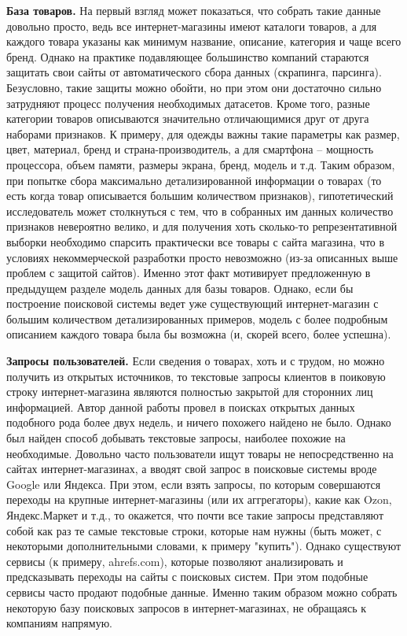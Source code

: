 \documentclass[12pt,a4paper]{article}
\begin{document}
\textbf{База товаров.} На первый взгляд может показаться, что собрать такие данные довольно просто, ведь все интернет-магазины имеют каталоги товаров, а для каждого товара указаны как минимум название, описание, категория и чаще всего бренд. Однако на практике подавляющее большинство компаний стараются защитать свои сайты от автоматического сбора данных (скрапинга, парсинга). Безусловно, такие защиты можно обойти, но при этом они достаточно сильно затрудняют процесс получения необходимых датасетов. Кроме того, разные категории товаров описываются значительно отличающимися друг от друга наборами признаков. К примеру, для одежды важны такие параметры как размер, цвет, материал, бренд и страна-производитель, а для смартфона -- мощность процессора, объем памяти, размеры экрана, бренд, модель и т.д. Таким образом, при попытке сбора максимально детализированной информации о товарах (то есть когда товар описывается большим количеством признаков), гипотетический исследователь может столкнуться с тем, что в собранных им данных количество признаков невероятно велико, и для получения хоть сколько-то репрезентативной выборки необходимо спарсить практически все товары с сайта магазина, что в условиях некоммерческой разработки просто невозможно (из-за описанных выше проблем с защитой сайтов). Именно этот факт мотивирует предложенную в предыдущем разделе модель данных для базы товаров. Однако, если бы построение поисковой системы ведет уже существующий интернет-магазин с большим количеством детализированных примеров, модель с более подробным описанием каждого товара была бы возможна (и, скорей всего, более успешна).

\textbf{Запросы пользователей.} Если сведения о товарах, хоть и с трудом, но можно получить из открытых источников, то текстовые запросы клиентов в поиковую строку интернет-магазина являются полностью закрытой для сторонних лиц информацией. Автор данной работы провел в поисках открытых данных подобного рода более двух недель, и ничего похожего найдено не было. Однако был найден способ добывать текстовые запросы, наиболее похожие на необходимые. Довольно часто пользователи ищут товары не непосредственно на сайтах интернет-магазинах, а вводят свой запрос в поисковые системы вроде Google или Яндекса. При этом, если взять запросы, по которым совершаются переходы на крупные интернет-магазины (или их аггрегаторы), какие как Ozon, Яндекс.Маркет и т.д., то окажется, что почти все такие запросы представляют собой как раз те самые текстовые строки, которые нам нужны (быть может, с некоторыми дополнительными словами, к примеру "купить"). Однако существуют сервисы (к примеру, ahrefs.com), которые позволяют анализировать и предсказывать переходы на сайты с поисковых систем. При этом подобные сервисы часто продают подобные данные. Именно таким образом можно собрать некоторую базу поисковых запросов в интернет-магазинах, не обращаясь к компаниям напрямую.
\end{document}
